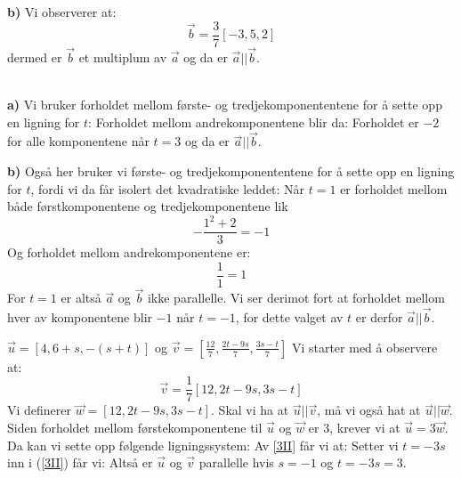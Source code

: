 \textbf{b)} Vi observerer at:
\[ \vec{b}=\frac{3}{7}[-3, 5, 2] \]
dermed er $ \vec{b} $ et multiplum av $ \vec{a} $ og da er $ \vec{a}||\vec{b} $.

\\
\textbf{a)} Vi bruker forholdet mellom første- og tredjekomponententene for å sette opp en ligning for $ t $:
Forholdet mellom andrekomponentene blir da:
Forholdet er $ -2 $ for alle komponentene når $ t=3 $ og da er $ \vec{a}||\vec{b} $.

\textbf{b)} Også her bruker vi første- og tredjekomponententene for å sette opp en ligning for $ t $, fordi vi da får isolert det kvadratiske leddet:
Når $ t=1 $ er forholdet mellom både førstkomponentene og tredjekomponentene lik
\[ -\frac{1^2+2}{3}=-1 \]
Og forholdet mellom andrekomponentene er:
\[ \frac{1}{1}=1 \]
For $ t=1 $ er altså $ \vec{a} $ og $ \vec{b} $ ikke parallelle. Vi ser derimot fort at forholdet mellom hver av komponentene blir $ -1 $ når $ t=-1 $, for dette valget av $ t $ er derfor $ \vec{a}||\vec{b} $.

$\vec{u}=[4, 6+s, -(s+t)] $ og $ \vec{v}=\left[\frac{12}{7}, \frac{2t-9s}{7}, \frac{3s-t}{7}\right] $
Vi starter med å observere at:
\[ \vec{v}=\frac{1}{7}[12, 2t-9s, 3s-t] \]
Vi definerer $ \vec{w}= [12, 2t-9s, 3s-t] $. Skal vi ha at $ \vec{u}||\vec{v} $, må vi også hat at $ \vec{u}||\vec{w} $. Siden forholdet mellom førstekomponentene til $ \vec{u} $ og $ \vec{w} $ er 3, krever vi at $ \vec{u}=3\vec{w} $. Da kan vi sette opp følgende ligningssystem:
Av \ref{3II} får vi at:
Setter vi $ t=-3s $ inn i (\ref{3II}) får vi:
Altså er $ \vec{u} $ og $ \vec{v} $ parallelle hvis $ s=-1 $ og $ t=-3s=3 $. 


